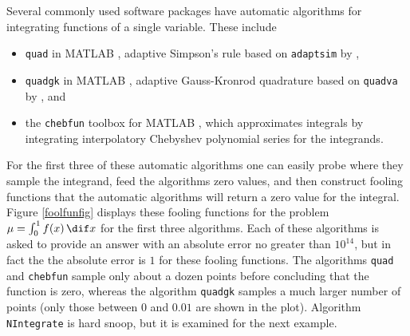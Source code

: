 \documentclass[graybox]{svmult}
\begin{document}
Several commonly used software packages have automatic algorithms for integrating functions of a single variable.  These include 
\begin{itemize} 

\item {\tt quad} in MATLAB \citep{MAT7.12}, adaptive Simpson's rule based on {\tt adaptsim} by \cite{GanGau00a},

\item {\tt quadgk} in MATLAB \citep{MAT7.12}, adaptive Gauss-Kronrod quadrature based on {\tt quadva} by \cite{Sha08a}, and

\item the {\tt chebfun} \citep{TrefEtal12} toolbox for MATLAB \citep{MAT7.12}, which approximates integrals by integrating interpolatory Chebyshev polynomial series for the integrands.


\end{itemize}

For the first three of these automatic algorithms one can easily probe where they sample the integrand, feed the algorithms zero values, and then construct fooling functions that the automatic algorithms will return a zero value for the integral.  Figure \ref{foolfunfig} displays these fooling functions for the problem $\mu=\int_0^1 f(x) \, \dif x$ for the first three algorithms. Each of these algorithms is asked to provide an answer with an absolute error no greater than $10^{14}$, but in fact the the absolute error is $1$ for these fooling functions.  The algorithms {\tt quad} and {\tt chebfun} sample only about a dozen points before concluding that the function is zero, whereas the algorithm {\tt quadgk} samples a much larger number of points (only those between $0$ and $0.01$ are shown in the plot). Algorithm {\tt NIntegrate} is hard snoop, but it is examined for the next example.
\end{document}
